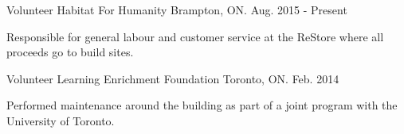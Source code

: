 

\begin{cventries}

  \cventry
    {Volunteer} %
    {Habitat For Humanity} %
    {Brampton, ON.} %
    {Aug. 2015 - Present} %
    {
      \begin{cvitems} %
        \item {Responsible for general labour and customer service at the ReStore where all proceeds go to build sites.}
      \end{cvitems}
    }

  \cventry
    {Volunteer} %
    {Learning Enrichment Foundation} %
    {Toronto, ON.} %
    {Feb. 2014} %
    {
      \begin{cvitems} %
        \item {Performed maintenance around the building as part of a joint program with the University of Toronto.}
      \end{cvitems}
    }

\end{cventries}
